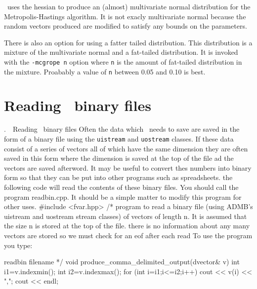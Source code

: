 \documentclass[12pt]{book}
\makeatletter
\def\mysection#1{\section{#1}{\bigbf \medbreak\noindent\number\c@chapter.\number\c@section\ \ #1\medbreak}}
\makeatother
\begin{document}
\ADM\  uses the hessian to produce an (almost) multivariate normal
distribution for the Metropolis-Hastings algorithm. It is not
exacly multivariate normal because the random vectors produced are
modified to satisfy any bounds on the parameters.

There is also an option for using a fatter tailed distribution.
This distribution is a mixture of the multivariate normal and
a fat-tailed distribution. It is invoked with the {\tt -mcgrope n}
option where {\tt n} is the amount of fat-tailed distribution in
the mixture. Proabably a value of {\tt n}
between 0.05 and 0.10 is best.


\mysection{Reading \ADM\ binary files}
Often the data which \ADM\ needs to save are saved in the form
of a binary file using the {\tt uistream} and {\tt uostream} classes. 
If these data consist of a series of vectors
all of which have the same dimension they are often saved in this
form where the dimension is saved at the top of the file
ad the vectors are saved afterword. It may be useful to
convert thes numbers into binary form so that they can be
put into other programs such as spreadsheets.
the following code will read the contents of these binary files.
You should call the program readbin.cpp. It should be
a simple matter to modify this program for other uses.
\beginexample
#include <fvar.hpp>
/*  program to read a binary file (using ADMB's uistream and
    uostream stream classes)  of vectors of length n.
    It is assumed that the size n is stored at the top of
    the file. there is no information about any many vectors
    are stored so we must check for an eof after each read
    To use the program you type:

                 readbin filename
*/
void produce_comma_delimited_output(dvector& v)
{
  int i1=v.indexmin();
  int i2=v.indexmax();
  for (int i=i1;i<=i2;i++)
  {
    cout << v(i) << ",";
  }
  cout << endl;
}
\end{document}
